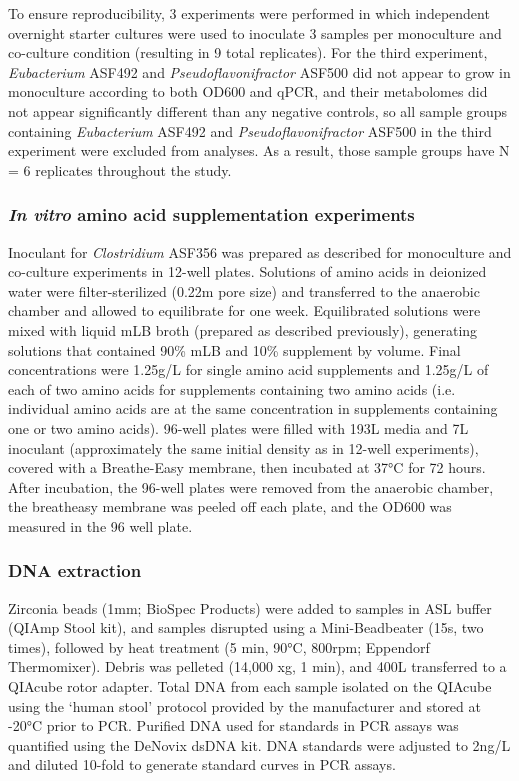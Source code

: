 \documentclass[11pt,twocolumn,notitlepage,openany,twoside]{book}
\begin{document}
\begin{refsection}
To ensure reproducibility, 3 experiments were performed in which independent overnight starter cultures were used to inoculate 3 samples per monoculture and co-culture condition (resulting in 9 total replicates). For the third experiment, \textit{Eubacterium} ASF492 and \textit{Pseudoflavonifractor} ASF500 did not appear to grow in monoculture according to both OD600 and qPCR, and their metabolomes did not appear significantly different than any negative controls, so all sample groups containing \textit{Eubacterium} ASF492 and \textit{Pseudoflavonifractor} ASF500 in the third experiment were excluded from analyses. As a result, those sample groups have N = 6 replicates throughout the study.

\subsubsection{\textit{In vitro} amino acid supplementation experiments}

Inoculant for \textit{Clostridium} ASF356 was prepared as described for monoculture and co-culture experiments in 12-well plates. Solutions of amino acids in deionized water were filter-sterilized (0.22{\textmu}m pore size) and transferred to the anaerobic chamber and allowed to equilibrate for one week. Equilibrated solutions were mixed with liquid mLB broth (prepared as described previously), generating solutions that contained 90\% mLB and 10\% supplement by volume. Final concentrations were 1.25g/L for single amino acid supplements and 1.25g/L of each of two amino acids for supplements containing two amino acids (i.e. individual amino acids are at the same concentration in supplements containing one or two amino acids). 96-well plates were filled with 193{\textmu}L media and 7{\textmu}L inoculant (approximately the same initial density as in 12-well experiments), covered with a Breathe-Easy membrane, then incubated at 37°C for 72 hours. After incubation, the 96-well plates were removed from the anaerobic chamber, the breatheasy membrane was peeled off each plate, and the OD600 was measured in the 96 well plate.

\subsubsection{DNA extraction}

Zirconia beads (1mm; BioSpec Products) were added to samples in ASL buffer (QIAmp Stool kit), and samples disrupted using a Mini-Beadbeater (15s, two times), followed by heat treatment (5 min, 90°C, 800rpm; Eppendorf Thermomixer). Debris was pelleted (14,000 xg, 1 min), and 400{\textmu}L transferred to a QIAcube rotor adapter. Total DNA from each sample isolated on the QIAcube using the ‘human stool’ protocol provided by the manufacturer and stored at -20°C prior to PCR. Purified DNA used for standards in PCR assays was quantified using the DeNovix dsDNA kit. DNA standards were adjusted to 2ng/{\textmu}L and diluted 10-fold to generate standard curves in PCR assays.


\end{refsection}
\end{document}
